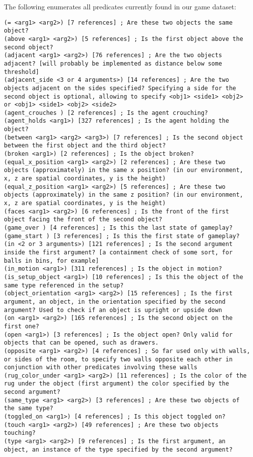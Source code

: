 \documentclass{article}
\begin{document}
The following enumerates all predicates currently found in our game dataset:

\begin{lstlisting}
(= <arg1> <arg2>) [7 references] ; Are these two objects the same object?
(above <arg1> <arg2>) [5 references] ; Is the first object above the second object?
(adjacent <arg1> <arg2>) [76 references] ; Are the two objects adjacent? [will probably be implemented as distance below some threshold]
(adjacent_side <3 or 4 arguments>) [14 references] ; Are the two objects adjacent on the sides specified? Specifying a side for the second object is optional, allowing to specify <obj1> <side1> <obj2> or <obj1> <side1> <obj2> <side2>
(agent_crouches ) [2 references] ; Is the agent crouching?
(agent_holds <arg1>) [327 references] ; Is the agent holding the object?
(between <arg1> <arg2> <arg3>) [7 references] ; Is the second object between the first object and the third object?
(broken <arg1>) [2 references] ; Is the object broken?
(equal_x_position <arg1> <arg2>) [2 references] ; Are these two objects (approximately) in the same x position? (in our environment, x, z are spatial coordinates, y is the height)
(equal_z_position <arg1> <arg2>) [5 references] ; Are these two objects (approximately) in the same z position? (in our environment, x, z are spatial coordinates, y is the height)
(faces <arg1> <arg2>) [6 references] ; Is the front of the first object facing the front of the second object?
(game_over ) [4 references] ; Is this the last state of gameplay?
(game_start ) [3 references] ; Is this the first state of gameplay?
(in <2 or 3 arguments>) [121 references] ; Is the second argument inside the first argument? [a containment check of some sort, for balls in bins, for example]
(in_motion <arg1>) [311 references] ; Is the object in motion?
(is_setup_object <arg1>) [10 references] ; Is this the object of the same type referenced in the setup?
(object_orientation <arg1> <arg2>) [15 references] ; Is the first argument, an object, in the orientation specified by the second argument? Used to check if an object is upright or upside down
(on <arg1> <arg2>) [165 references] ; Is the second object on the first one?
(open <arg1>) [3 references] ; Is the object open? Only valid for objects that can be opened, such as drawers.
(opposite <arg1> <arg2>) [4 references] ; So far used only with walls, or sides of the room, to specify two walls opposite each other in conjunction with other predicates involving these walls
(rug_color_under <arg1> <arg2>) [11 references] ; Is the color of the rug under the object (first argument) the color specified by the second argument?
(same_type <arg1> <arg2>) [3 references] ; Are these two objects of the same type?
(toggled_on <arg1>) [4 references] ; Is this object toggled on?
(touch <arg1> <arg2>) [49 references] ; Are these two objects touching?
(type <arg1> <arg2>) [9 references] ; Is the first argument, an object, an instance of the type specified by the second argument?
\end{lstlisting}
\end{document}
